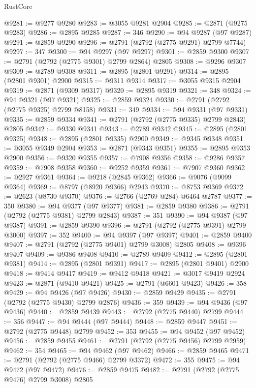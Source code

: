 \begin{lexlean}{RustCore}
\begin{coremodule}
@9281 := @9277 @9280
@9283 := @3055 @9281 @2904
@9285 := @2871 (@9275 @9283)
@9286 := @2895 @9285
@9287 := 346
@9290 := @94 @9287 (@97 @9287)
@9291 := @2859 @9290
@9296 := @2791 (@2792 (@2775 @9291) @2799 @7744)
@9297 := 347
@9300 := @94 @9297 (@97 @9297)
@9301 := @2859 @9300
@9307 := @2791 (@2792 (@2775 @9301) @2799 @2864) @2805
@9308 := @9296 @9307
@9309 := @2789 @9308
@9311 := @2895 (@2801 @9291)
@9314 := @2895 (@2801 @9301) @2900
@9315 := @9311 @9314
@9317 := @3055 @9315 @2904
@9319 := @2871 (@9309 @9317)
@9320 := @2895 @9319
@9321 := 348
@9324 := @94 @9321 (@97 @9321)
@9325 := @2859 @9324
@9330 := @2791 (@2792 (@2775 @9325) @2799 @8158)
@9331 := 349
@9334 := @94 @9331 (@97 @9331)
@9335 := @2859 @9334
@9341 := @2791 (@2792 (@2775 @9335) @2799 @2843) @2805
@9342 := @9330 @9341
@9343 := @2789 @9342
@9345 := @2895 (@2801 @9325)
@9348 := @2895 (@2801 @9335) @2900
@9349 := @9345 @9348
@9351 := @3055 @9349 @2904
@9353 := @2871 (@9343 @9351)
@9355 := @2895 @9353 @2900
@9356 := @9320 @9355
@9357 := @7908 @9356
@9358 := @9286 @9357
@9359 := @7908 @9358
@9360 := @9252 @9359
@9361 := @7907 @9360
@9362 := @2927 @9361
@9364 := @9218 (@2845 @9362)
@9366 := @9076 (@9099 @9364)
@9369 := @8797 (@8920 @9366) @2943
@9370 := @8753 @9369
@9372 := @2623 (@8730 @9370)
@9376 := @2766 (@2769 @284) @6464 @2787
@9377 := 350
@9380 := @94 @9377 (@97 @9377)
@9381 := @2859 @9380
@9386 := @2791 (@2792 (@2775 @9381) @2799 @2843)
@9387 := 351
@9390 := @94 @9387 (@97 @9387)
@9391 := @2859 @9390
@9396 := @2791 (@2792 (@2775 @9391) @2799 @3000)
@9397 := 352
@9400 := @94 @9397 (@97 @9397)
@9401 := @2859 @9400
@9407 := @2791 (@2792 (@2775 @9401) @2799 @3008) @2805
@9408 := @9396 @9407
@9409 := @9386 @9408
@9410 := @2789 @9409
@9412 := @2895 (@2801 @9381)
@9414 := @2895 (@2801 @9391)
@9417 := @2895 (@2801 @9401) @2900
@9418 := @9414 @9417
@9419 := @9412 @9418
@9421 := @3017 @9419 @2924
@9423 := @2871 (@9410 @9421)
@9425 := @2791 (@6601 @9423)
@9426 := 358
@9429 := @94 @9426 (@97 @9426)
@9430 := @2859 @9429
@9435 := @2791 (@2792 (@2775 @9430) @2799 @2876)
@9436 := 359
@9439 := @94 @9436 (@97 @9436)
@9440 := @2859 @9439
@9443 := @2792 (@2775 @9440) @2799
@9444 := 356
@9447 := @94 @9444 (@97 @9444)
@9448 := @2859 @9447
@9451 := @2792 (@2775 @9448) @2799
@9452 := 353
@9455 := @94 @9452 (@97 @9452)
@9456 := @2859 @9455
@9461 := @2791 (@2792 (@2775 @9456) @2799 @2959)
@9462 := 354
@9465 := @94 @9462 (@97 @9462)
@9466 := @2859 @9465
@9471 := @2791 (@2792 (@2775 @9466) @2799 @3372)
@9472 := 355
@9475 := @94 @9472 (@97 @9472)
@9476 := @2859 @9475
@9482 := @2791 (@2792 (@2775 @9476) @2799 @3008) @2805

\end{coremodule}
\end{lexlean}
